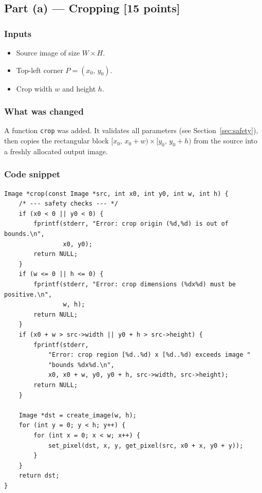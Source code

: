 \documentclass[12pt,a4paper]{article}
\begin{document}
\subsection{Part (a) — Cropping \textnormal{[15 points]}}

\subsubsection*{Inputs}
\begin{itemize}
    \item Source image of size \(W \times H\).
    \item Top-left corner \(P = (x_0,\, y_0)\).
    \item Crop width \(w\) and height \(h\).
\end{itemize}

\subsubsection*{What was changed}
A function \texttt{crop} was added.
It validates all parameters (see Section~\ref{sec:safety}), then copies the
rectangular block \([x_0,\, x_0+w) \times [y_0,\, y_0+h)\) from the source
into a freshly allocated output image.

\subsubsection*{Code snippet}

\begin{lstlisting}
Image *crop(const Image *src, int x0, int y0, int w, int h) {
    /* --- safety checks --- */
    if (x0 < 0 || y0 < 0) {
        fprintf(stderr, "Error: crop origin (%d,%d) is out of bounds.\n",
                x0, y0);
        return NULL;
    }
    if (w <= 0 || h <= 0) {
        fprintf(stderr, "Error: crop dimensions (%dx%d) must be positive.\n",
                w, h);
        return NULL;
    }
    if (x0 + w > src->width || y0 + h > src->height) {
        fprintf(stderr,
            "Error: crop region [%d..%d) x [%d..%d) exceeds image "
            "bounds %dx%d.\n",
            x0, x0 + w, y0, y0 + h, src->width, src->height);
        return NULL;
    }

    Image *dst = create_image(w, h);
    for (int y = 0; y < h; y++) {
        for (int x = 0; x < w; x++) {
            set_pixel(dst, x, y, get_pixel(src, x0 + x, y0 + y));
        }
    }
    return dst;
}
\end{lstlisting}
\end{document}
